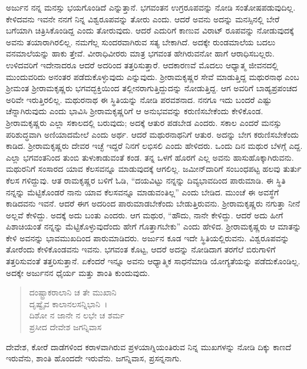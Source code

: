 ಅರ್ಜುನ ನನ್ನ ಮನಸ್ಸು ಭಯಗೊಂಡಿದೆ ಎನ್ನುತ್ತಾನೆ. ಭಗವಂತನ ಉಗ್ರರೂಪವನ್ನು ನೋಡಿ ಸಂತೋಷಪಡುವುದಿಲ್ಲ. ಕೇಳಿದವನು ಇವನೇ ನನಗೆ ನಿನ್ನ ವಿಶ್ವರೂಪವನ್ನು ತೋರು ಎಂದು. ಆದರೆ ಅವನು ಅದನ್ನು ಮನಸ್ಸಿನಲ್ಲಿ ಬೇರೆ ಬಗೆಯಾಗಿ ಚಿತ್ರಿಸಿಕೊಂಡಿದ್ದ ಎಂದು ತೋರುವುದು. ಆದರೆ ಎದುರಿಗೆ ಕಾಣುವ ವಿರಾಟ್ ರೂಪವನ್ನು ನೋಡುವುದಕ್ಕೆ ಅವನು ತಯಾರಾಗಿರಲಿಲ್ಲ. ನಮಗೆಲ್ಲ ಸುಂದರವಾಗಿರುವ ಸತ್ಯ ಬೇಕಾಗಿದೆ. ಅದಕ್ಕೇ ರುಂಡಮಾಲೆಯ ಬದಲು ವನಮಾಲೆಯನ್ನು ಹಾಕು ತ್ತೇವೆ. ವೀರಾಧಿವೀರರು ಮಾತ್ರ ಭಗವಂತ ಹೇಗಿರುವನೋ ಹಾಗೆ ಆರಾಧಿಸಬಲ್ಲರು. ಉಳಿದವರಿಗೆ ಇದೇನಾದರೂ ಆದರೆ ಅದರಿಂದ ತತ್ತರಿಸುತ್ತಾರೆ. ಆದಕಾರಣವೆ ಮೊದಲು ಆಧ್ಯಾತ್ಮ ಜೀವನದಲ್ಲಿ ಮುಂದುವರಿದು ಅನಂತರ ಪಡೆದುಕೊಳ್ಳುವುದು ಎನ್ನುವುದು. ಶ‍್ರೀರಾಮಕೃಷ್ಣರ ಸೇವೆ ಮಾಡುತ್ತಿದ್ದ ಮಥುರನಾಥ ಎಂಬ ಶ‍್ರೀಮಂತ ಶ‍್ರೀರಾಮಕೃಷ್ಣರು ಭಗವದ್ಭಕ್ತಿಯಿಂದ ತಲ್ಲೀನರಾಗುತ್ತಿದ್ದುದನ್ನು ನೋಡುತ್ತಿದ್ದ. ಆಗ ಅವರಿಗೆ ಬಾಹ್ಯಪ್ರಪಂಚದ ಅರಿವೇ ಇರುತ್ತಿರಲಿಲ್ಲ. ಮಥುರನಾಥ ಈ ಸ್ಥಿತಿಯನ್ನು ನೋಡಿ ಪರವಶನಾದ. ನನಗೂ ಇದು ಬಂದರೆ ಎಷ್ಟು ಚೆನ್ನಾಗಿರುವುದು ಎಂದು ಭಾವಿಸಿ ಶ‍್ರೀರಾಮಕೃಷ್ಣರಿಗೆ ಆ ಅನುಭವವನ್ನು ಕರುಣಿಸಬೇಕೆಂದು ಕೇಳಿಕೊಂಡ. ಶ‍್ರೀರಾಮಕೃಷ್ಣರು ಎಲ್ಲಾ ಸಕಾಲದಲ್ಲಿ ಬರುವುದು; ಅದಕ್ಕೆ ಆತುರ ಪಡಬೇಡ ಎಂದರು. ಸಕಾಲ ಎಂದರೆ ಮನಸ್ಸು ಪರಿಶುದ್ಧವಾಗಿ ಅಣಿಯಾದಮೇಲೆ ಎಂದು ಅರ್ಥ. ಆದರೆ ಮಥುರನಾಥನಿಗೆ ಆತುರ. ಅದನ್ನು ಬೇಗ ಕರುಣಿಸಬೇಕೆಂದು ಕಾಡಿದ. ಶ‍್ರೀರಾಮಕೃಷ್ಣರು ದೇವರ ಇಚ್ಛೆ ಇದ್ದರೆ ನಿನಗೆ ಲಭಿಸಲಿ ಎಂದು ಹೇಳಿದರು. ಒಂದು ದಿನ ಮಥುರ ಬೆಳಗ್ಗೆ ಎದ್ದ. ಎಲ್ಲಾ ಭಗವಂತನಿಂದ ತುಂಬಿ ತುಳುಕಾಡುವಂತೆ ಕಂಡ. ತನ್ನ ಒಳಗೆ ಹೊರಗೆ ಎಲ್ಲ ಅವನು ಹಾಸುಹೊಕ್ಕಾಗಿರುವನು. ಮಥುರನಿಗೆ ಸಂಸಾರದ ಯಾವ ಕೆಲಸವನ್ನೂ ಮಾಡುವುದಕ್ಕೆ ಆಗಲಿಲ್ಲ. ಜಮೀನ್​ದಾರಿಗೆ ಸಂಬಂಧಪಟ್ಟ ಹಲವು ತುರ್ತು ಕೆಲಸ ಗಳಿದ್ದುವು. ಆತ ರಾಮಕೃಷ್ಣರ ಬಳಿಗೆ ಓಡಿ, “ದಯವಿಟ್ಟು ನನ್ನನ್ನು ದಿವ್ಯಭಾವದಿಂದ ಪಾರುಮಾಡಿ. ಈ ಸ್ಥಿತಿ ನನ್ನನ್ನು ಮೆಟ್ಟಿಕೊಂಡರೆ ನಾನು ಯಾವ ಕೆಲಸವನ್ನೂ ಮಾಡುವಂತಿಲ್ಲ” ಎಂದು ಬೇಡಿದ. ಮುಂಚೆ ಈ ಅವಸ್ಥೆಗೆ ಕಾಡಿದವನು ಇವನೆ. ಆದರೆ ಈಗ ಅದರಿಂದ ಪಾರುಮಾಡಬೇಕೆಂದು ಬೇಡುತ್ತಿರುವನು. ಶ‍್ರೀರಾಮಕೃಷ್ಣರು ನಗುತ್ತಾ ನೀನೆ ಅಲ್ಲವೆ ಕೇಳಿದ್ದು. ಅದಕ್ಕೆ ಅದು ಬಂತು ಎಂದರು. ಆಗ ಮಥುರ, “ಹೌದು, ನಾನೇ ಕೇಳಿದ್ದು. ಆದರೆ ಅದು ಹೀಗೆ ಪಿಶಾಚಿಯಂತೆ ನನ್ನನ್ನು ಮೆಟ್ಟಿಕೊಳ್ಳುವುದೆಂದು ಹೇಗೆ ಗೊತ್ತಾಗಬೇಕು” ಎಂದು ಹೇಳಿದ. ಶ‍್ರೀರಾಮಕೃಷ್ಣರು ಆ ಮಾತನ್ನು ಕೇಳಿ ಅವನನ್ನು ಭಾವಮುಖದಿಂದ ಪಾರುಮಾಡಿದರು. ಅರ್ಜುನ ಕೂಡ ಇದೇ ಸ್ಥಿತಿಯಲ್ಲಿರುವನು. ವಿಶ್ವರೂಪವನ್ನು ತೋರೆಂದು ಕೇಳಿಕೊಂಡವನು ಇವನು. ಭಗವಂತ ಕೊಟ್ಟ, ಆದರೆ ಅದನ್ನು ನೋಡಿದಾಗ ತರಗೆಲೆ ಬಿರುಗಾಳಿಗೆ ತತ್ತರಿಸುವಂತೆ ತತ್ತರಿಸುತ್ತಾನೆ. ಏಕೆಂದರೆ ಇನ್ನೂ ಅವನು ಆಧ್ಯಾತ್ಮಿಕ ಸಾಧನೆಮಾಡಿ ಯೋಗ್ಯತೆಯನ್ನು ಪಡೆದುಕೊಂಡಿಲ್ಲ. ಅದಕ್ಕೇ ಅರ್ಜುನನ ಧೈರ್ಯ ಮತ್ತು ಶಾಂತಿ ಕುಂದುವುದು.

\begin{verse}
ದಂಷ್ಟ್ರಾಕರಾಲಾನಿ ಚ ತೇ ಮುಖಾನಿ \\ ದೃಷ್ವೈವ ಕಾಲಾನಲಸನ್ನಿಭಾನಿ~।\\ದಿಶೋ ನ ಜಾನೇ ನ ಲಭೇ ಚ ಶರ್ಮ \\ ಪ್ರಸೀದ ದೇವೇಶ ಜಗನ್ನಿವಾಸ 
\end{verse}

{\small ದೇವೇಶ, ಕೋರೆ ದಾಡೆಗಳಿಂದ ಕರಾಳವಾಗಿರುವ ಪ್ರಳಯಾಗ್ನಿಯಂತಿರುವ ನಿನ್ನ ಮುಖಗಳನ್ನು ನೋಡಿ ದಿಕ್ಕು ಕಾಣದೆ ಇರುವೆನು, ಶಾಂತಿ ಹೊಂದದೇ ಇರುವೆನು. ಜಗನ್ನಿವಾಸ, ಪ್ರಸನ್ನನಾಗು.}

